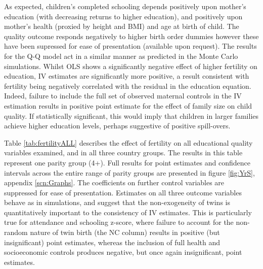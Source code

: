 \documentclass{article}[11pt,subeqn]
\begin{document}
\begin{spacing}{1.5}

As expected, children's completed schooling depends positively upon mother's education (with decreasing returns to higher education), 
and positively upon mother's health (proxied by height and BMI) and age at birth of child.  The quality outcome responds negatively to higher birth order dummies
however these have been supressed for ease of presentation (available upon request).  The results for the Q-Q model act in a similar manner as predicted in the Monte
Carlo simulations.  Whilst OLS shows a significantly negative effect of higher fertility on education, IV estimates are significantly more positive, a result consistent with
fertility being negatively correlated with the residual in the education equation.  Indeed, failure to 
include the full set of observed maternal controls in the IV estimation results in positive point estimate for the effect of family size on child quality. 
If statistically significant, this would imply that children in larger families achieve higher education levels, perhaps suggestive of positive spill-overs. 


Table \ref{tab:fertilityALL} describes the effect of fertility on all educational quality variables examined, and in all three country groups.  The results in this table 
represent one parity group (4+).  Full results for point  estimates and confidence intervals across the entire range of parity groups are presented in figure \ref{fig:YrS}, appendix \ref{scn:Graphs}. The coefficients on further control variables are suppressed for ease of presentation. Estimates on all three outcome variables behave as in simulations, and suggest that the non-exogeneity of twins is quantitatively important to the consistency of IV estimates.  This is particularly true for attendance and schooling z-score, where failure to account for the non-random nature of twin birth (the NC column) results in positive (but insignificant) point estimates, whereas the inclusion of full health and socioeconomic controls produces negative, but once again insignificant, point estimates.



\end{spacing}
\end{document}
